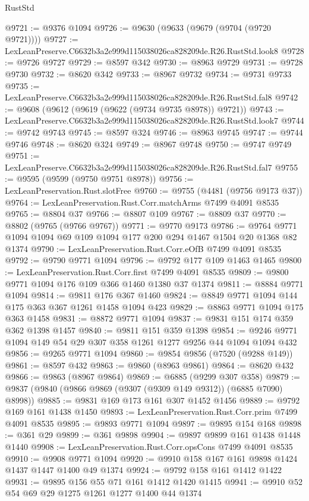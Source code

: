 \begin{lexlean}{RustStd}
\begin{coremodule}
@9721 := @9376 @1094
@9726 := @9630 (@9633 (@9679 (@9704 (@9720 @9721))))
@9727 := LexLeanPreserve.C6632b3a2e999d115038026ca828209de.R26.RustStd.look8
@9728 := @9726 @9727
@9729 := @8597 @342
@9730 := @8963 @9729
@9731 := @9728 @9730
@9732 := @8620 @342
@9733 := @8967 @9732
@9734 := @9731 @9733
@9735 := LexLeanPreserve.C6632b3a2e999d115038026ca828209de.R26.RustStd.fal8
@9742 := @9608 (@9612 (@9619 (@9622 (@9734 @9735 @8978)) @9721))
@9743 := LexLeanPreserve.C6632b3a2e999d115038026ca828209de.R26.RustStd.look7
@9744 := @9742 @9743
@9745 := @8597 @324
@9746 := @8963 @9745
@9747 := @9744 @9746
@9748 := @8620 @324
@9749 := @8967 @9748
@9750 := @9747 @9749
@9751 := LexLeanPreserve.C6632b3a2e999d115038026ca828209de.R26.RustStd.fal7
@9755 := @9595 (@9599 (@9750 @9751 @8978))
@9756 := LexLeanPreservation.Rust.slotFree
@9760 := @9755 (@4481 (@9756 @9173 @37))
@9764 := LexLeanPreservation.Rust.Corr.matchArms @7499 @4091 @8535
@9765 := @8804 @37
@9766 := @8807 @109
@9767 := @8809 @37
@9770 := @8802 (@9765 (@9766 @9767))
@9771 := @9770 @9173
@9786 := @9764 @9771 @1094 @1094 @69 @109 @1094 @177 @200 @294 @1467 @1504 @20 @1368 @82 @1374
@9790 := LexLeanPreservation.Rust.Corr.eOfB @7499 @4091 @8535
@9792 := @9790 @9771 @1094
@9796 := @9792 @177 @109 @1463 @1465
@9800 := LexLeanPreservation.Rust.Corr.first @7499 @4091 @8535
@9809 := @9800 @9771 @1094 @176 @109 @366 @1460 @1380 @37 @1374
@9811 := @8884 @9771 @1094
@9814 := @9811 @176 @367 @1460
@9824 := @8849 @9771 @1094 @144 @175 @363 @367 @1261 @1458 @1094 @423
@9829 := @8863 @9771 @1094 @175 @363 @1458
@9831 := @8872 @9771 @1094
@9837 := @9831 @151 @174 @359 @362 @1398 @1457
@9840 := @9811 @151 @359 @1398
@9854 := @9246 @9771 @1094 @149 @54 @29 @307 @358 @1261 @1277 @9256 @44 @1094 @1094 @432
@9856 := @9265 @9771 @1094
@9860 := @9854 @9856 (@7520 (@9288 @149))
@9861 := @8597 @432
@9863 := @9860 (@8963 @9861)
@9864 := @8620 @432
@9866 := @9863 (@8967 @9864)
@9869 := @6885 (@9299 @307 @358)
@9879 := @9837 (@9840 (@9866 @9869 (@9307 (@9309 @149 @9312)) (@6885 @7090) @8998))
@9885 := @9831 @169 @173 @161 @307 @1452 @1456
@9889 := @9792 @169 @161 @1438 @1450
@9893 := LexLeanPreservation.Rust.Corr.prim @7499 @4091 @8535
@9895 := @9893 @9771 @1094
@9897 := @9895 @154 @168
@9898 := @361 @29
@9899 := @361 @9898
@9904 := @9897 @9899 @161 @1438 @1448 @1440
@9908 := LexLeanPreservation.Rust.Corr.opsCons @7499 @4091 @8535
@9910 := @9908 @9771 @1094
@9920 := @9910 @158 @167 @161 @9898 @1424 @1437 @1447 @1400 @49 @1374
@9924 := @9792 @158 @161 @1412 @1422
@9931 := @9895 @156 @55 @71 @161 @1412 @1420 @1415
@9941 := @9910 @52 @54 @69 @29 @1275 @1261 @1277 @1400 @44 @1374

\end{coremodule}
\end{lexlean}
